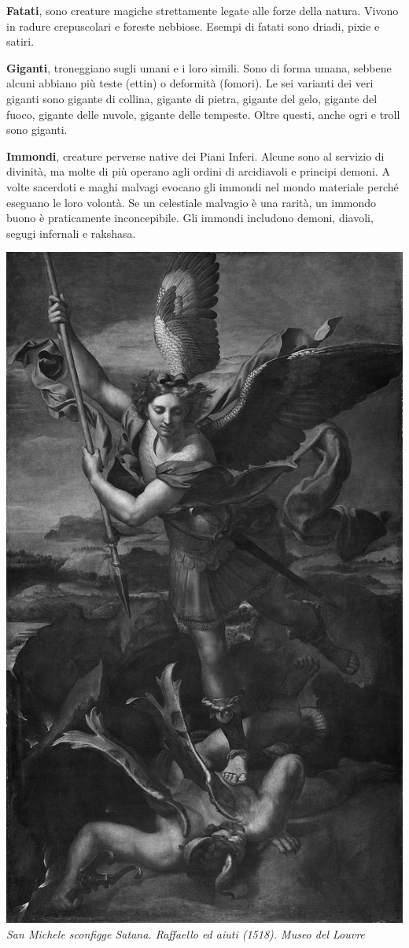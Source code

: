 \begin{multicols}{2}
\medskip\textbf{Fatati}, sono creature magiche strettamente legate alle forze della natura. Vivono in radure crepuscolari e foreste nebbiose. Esempi di fatati sono driadi, pixie e satiri.

\medskip\textbf{Giganti}, troneggiano sugli umani e i loro simili. Sono di forma umana, sebbene alcuni abbiano più teste (ettin) o deformità (fomori). Le sei varianti dei veri giganti sono gigante di collina, gigante di pietra, gigante del gelo, gigante del fuoco, gigante delle nuvole, gigante delle tempeste. Oltre questi, anche ogri e troll sono giganti. 

\medskip\textbf{Immondi}, creature perverse native dei Piani Inferi. Alcune sono al servizio di  divinità, ma molte di più operano agli ordini di arcidiavoli e principi demoni. A volte sacerdoti e maghi malvagi evocano gli immondi nel mondo materiale perché eseguano le loro volontà. Se un celestiale malvagio è una rarità, un immondo buono è praticamente inconcepibile. Gli immondi includono demoni, diavoli, segugi infernali e rakshasa. 

\begin{center}
	\includegraphics[width=0.8\linewidth]{immagini/sanmichelesatana.png}\\
	\textit{San Michele sconfigge Satana. Raffaello ed aiuti (1518). Museo del Louvre}
\end{center}


\end{multicols}
